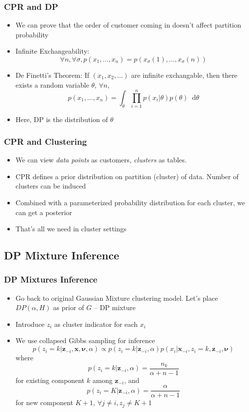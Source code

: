 \documentclass{beamer}
\newcommand*\diff{\mathop{}\!\mathrm{d}}
\begin{document}
\begin{frame}
	\frametitle{CPR and DP}
	\begin{itemize}
		\item We can prove that the order of customer coming in doesn't affect partition probability
		\item Infinite Exchangeability:
			\[
			\forall n, \forall \sigma, p(x_1, \ldots, x_n)=p(x_\sigma(1),\ldots, x_\sigma(n))
			\]
		\item De Finetti’s Theorem: If $(x_1, x_2, \ldots)$ are infinite exchangable, then there exists a random variable $\theta$, $\forall n$, 
			\[
			 p(x_1, \ldots, x_n) = \int_{\theta} \prod_{i=1}^n p(x_i|\theta)p(\theta) \diff \theta
			\]		
		\item Here, DP is the distribution of $\theta$	
	\end{itemize}
\end{frame}

\begin{frame}
	\frametitle{CPR and Clustering}
	\begin{itemize}
		\item We can view {\em data points} as customers, {\em clusters} as tables.
		\item CPR defines a prior distribution on partition (cluster) of data. Number of clusters can be induced
		\item Combined with a parameterized probability distribution for each cluster, we can get a posterior
		\item That's all we need in cluster settings
	\end{itemize}
\end{frame}

\subsection{DP Mixture Inference}

\begin{frame}
	\frametitle{DP Mixtures Inference}
	\begin{itemize}
		\item Go back to original Gaussian Mixture clustering model. Let's place $DP(\alpha,H)$ as prior of $G$ -- DP mixture
		\item Introduce $z_i$ as cluster indicator for each $x_i$
		\item We use collapsed Gibbs sampling for inference
		\[
			p(z_i=k|\bm{z}_{-i},\bm{x},\bm{\nu},\alpha) \propto p(z_i=k|\bm{z}_{-i}, \alpha)p(x_i|\bm{x}_{-i}, z_i=k, \bm{z}_{-i}, \bm{\nu})
		\]
		where \[
			p(z_i=k|\bm{z}_{-i}, \alpha) = \frac{n_k}{\alpha+n-1}
		\] for existing component $k$ among $\bm{z}_{-i}$, and 
		\[
			p(z_i=K|\bm{z}_{-i}, \alpha) = \frac{\alpha}{\alpha+n-1}
		\] for new component $K+1$, $\forall j \neq i, z_j \neq K+1$
	\end{itemize}
\end{frame}
\end{document}
